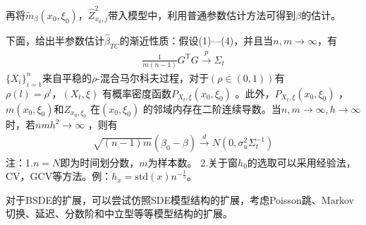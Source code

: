 		再将${{\tilde m}_\beta }\left( {{x_0},{\xi _0}} \right)$，$\hat Z_{{x_0},j}^2$带入模型中，利用普通参数估计方法可得到$\beta$的估计。
		\par
		下面，给出半参数估计$\hat{\beta}_{TC}$的渐近性质：假设(1)—(4)，并且当$n,m \rightarrow \infty$，有
		\begin{align*}
		\frac{1}{m({n - 1})} {G^\mathrm{T}}G{\xrightarrow{p}}{\Sigma}_t
		\end{align*}
		$\{ X_i\}_{i=1}^n$来自平稳的$\rho$-混合马尔科夫过程，对于$(\rho \in(0,1))$有$\rho(l)={\rho}^l ，(X_t,\xi)$ 有概率密度函数$P_{{X_t},\xi}(x_0,\xi_0)$ 。此外，$P_{{X_t},\xi}(x_0,\xi_0)$ ， $m(x_0,\xi_0)$和$Z_{x_0,\xi_0}$ 在$(x_0,\xi_0)$ 的邻域内存在二阶连续导数。当${n,m}\rightarrow\infty,h\rightarrow\infty$时，若$nmh^2\rightarrow\infty$ ，则有
		\begin{align*}
		{\sqrt {(n-1)m}} \left( {\hat \beta_0  - \beta } \right)\xrightarrow{d} N\left( {0,{\sigma ^2_u}{{\Sigma}_t ^{ - 1}}} \right)
		\end{align*}
		注：1.$n=N$即为时间划分数，$m$为样本数。
		2.关于窗$h_0$的选取可以采用经验法，CV，GCV等方法。例：$h_x=\mathrm{std}(x) n^{-\frac 15}$。
		\par
		对于BSDE的扩展，可以尝试仿照SDE模型结构的扩展，考虑Poisson跳、Markov切换、延迟、分数阶和中立型等等模型结构的扩展。



